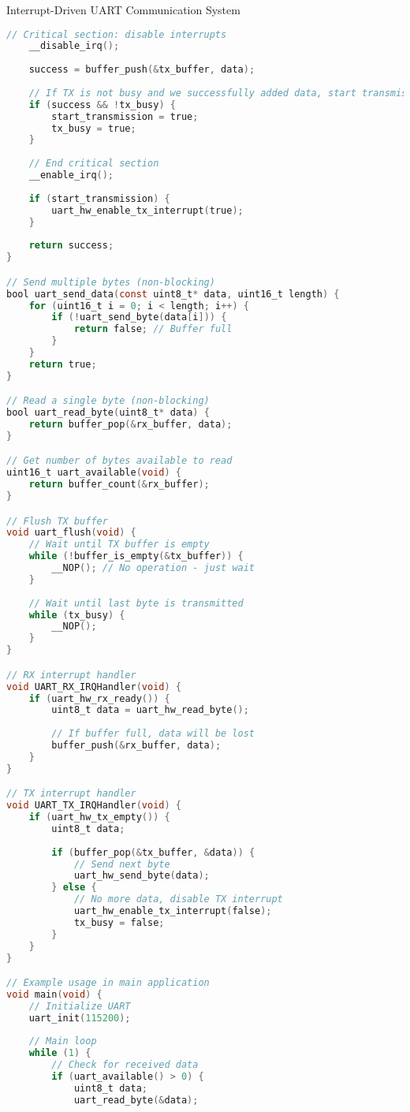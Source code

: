 \begin{example2}{Interrupt-Driven UART Communication System}
\begin{lstlisting}[language=C, style=basesmol]
    // Critical section: disable interrupts
    __disable_irq();
    
    success = buffer_push(&tx_buffer, data);
    
    // If TX is not busy and we successfully added data, start transmission
    if (success && !tx_busy) {
        start_transmission = true;
        tx_busy = true;
    }
    
    // End critical section
    __enable_irq();
    
    if (start_transmission) {
        uart_hw_enable_tx_interrupt(true);
    }
    
    return success;
}

// Send multiple bytes (non-blocking)
bool uart_send_data(const uint8_t* data, uint16_t length) {
    for (uint16_t i = 0; i < length; i++) {
        if (!uart_send_byte(data[i])) {
            return false; // Buffer full
        }
    }
    return true;
}

// Read a single byte (non-blocking)
bool uart_read_byte(uint8_t* data) {
    return buffer_pop(&rx_buffer, data);
}

// Get number of bytes available to read
uint16_t uart_available(void) {
    return buffer_count(&rx_buffer);
}

// Flush TX buffer
void uart_flush(void) {
    // Wait until TX buffer is empty
    while (!buffer_is_empty(&tx_buffer)) {
        __NOP(); // No operation - just wait
    }
    
    // Wait until last byte is transmitted
    while (tx_busy) {
        __NOP();
    }
}

// RX interrupt handler
void UART_RX_IRQHandler(void) {
    if (uart_hw_rx_ready()) {
        uint8_t data = uart_hw_read_byte();
        
        // If buffer full, data will be lost
        buffer_push(&rx_buffer, data);
    }
}

// TX interrupt handler
void UART_TX_IRQHandler(void) {
    if (uart_hw_tx_empty()) {
        uint8_t data;
        
        if (buffer_pop(&tx_buffer, &data)) {
            // Send next byte
            uart_hw_send_byte(data);
        } else {
            // No more data, disable TX interrupt
            uart_hw_enable_tx_interrupt(false);
            tx_busy = false;
        }
    }
}

// Example usage in main application
void main(void) {
    // Initialize UART
    uart_init(115200);
    
    // Main loop
    while (1) {
        // Check for received data
        if (uart_available() > 0) {
            uint8_t data;
            uart_read_byte(&data);
            

\end{lstlisting}
\end{example2}
